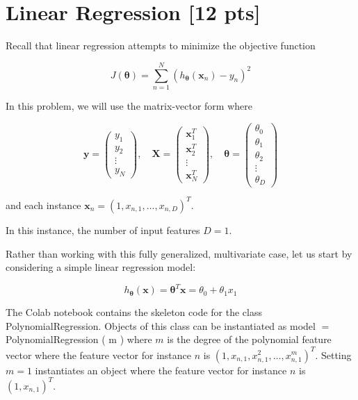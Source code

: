 \documentclass[10pt]{article}
\begin{document}
\section*{Linear Regression [12 pts]}
Recall that linear regression attempts to minimize the objective function

$$
J(\boldsymbol{\theta})=\sum_{n=1}^{N}\left(h_{\boldsymbol{\theta}}\left(\boldsymbol{x}_{n}\right)-y_{n}\right)^{2}
$$

In this problem, we will use the matrix-vector form where

$$
\boldsymbol{y}=\left(\begin{array}{c}
y_{1} \\
y_{2} \\
\vdots \\
y_{N}
\end{array}\right), \quad \boldsymbol{X}=\left(\begin{array}{c}
\boldsymbol{x}_{1}^{T} \\
\boldsymbol{x}_{2}^{T} \\
\vdots \\
\boldsymbol{x}_{N}^{T}
\end{array}\right), \quad \boldsymbol{\theta}=\left(\begin{array}{c}
\theta_{0} \\
\theta_{1} \\
\theta_{2} \\
\vdots \\
\theta_{D}
\end{array}\right)
$$

and each instance $\boldsymbol{x}_{n}=\left(1, x_{n, 1}, \ldots, x_{n, D}\right)^{T}$.

In this instance, the number of input features $D=1$.

Rather than working with this fully generalized, multivariate case, let us start by considering a simple linear regression model:

$$
h_{\boldsymbol{\theta}}(\boldsymbol{x})=\boldsymbol{\theta}^{T} \boldsymbol{x}=\theta_{0}+\theta_{1} x_{1}
$$

The Colab notebook contains the skeleton code for the class PolynomialRegression. Objects of this class can be instantiated as model $=$ PolynomialRegression ( $\mathrm{m}$ ) where $m$ is the degree of the polynomial feature vector where the feature vector for instance $n$ is $\left(1, x_{n, 1}, x_{n, 1}^{2}, \ldots, x_{n, 1}^{m}\right)^{T}$. Setting $m=1$ instantiates an object where the feature vector for instance $n$ is $\left(1, x_{n, 1}\right)^{T}$.
\end{document}
